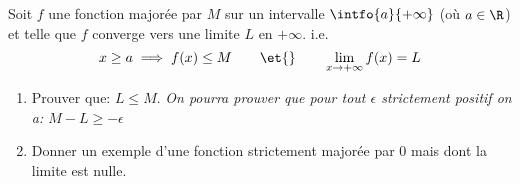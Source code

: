 \begin{exercice}
 Soit $f$ une fonction major\'ee par $M$ sur un intervalle
  $\intfo{a}{+\infty}$ (o\`u $a\in\R$) et telle que $f$ converge vers
  une limite $L$ en $+\infty$. i.e.
\[ x\geq a \implies f(x)\leq M\qquad \et{}\qquad
\lim_{x\to+\infty}f(x)=L\]
\begin{enumerate}
\item Prouver que: $L\leq M$. \emph{On pourra prouver que pour tout
  $\epsilon$ strictement positif on a: $M-L\geq-\epsilon$}
\item Donner un exemple d'une fonction strictement major\'ee par 0 mais
  dont la limite est nulle.

\end{enumerate}
 
\end{exercice}
